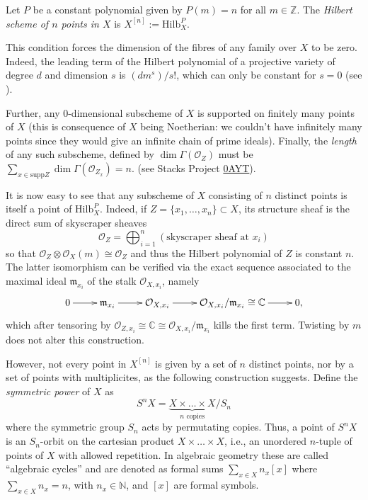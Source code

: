 \begin{definition}
\label{definition-hilbert-scheme-of-points}
Let $P$ be a constant polynomial given by
$P(m)=n$ for all $m \in \mathbb{Z}$.
The {\it Hilbert scheme of $n$ points in
$X$} is $X^{[n]}:=\text{Hilb}^P_X$.
\end{definition}

\noindent
This condition forces the dimension of the
fibres of any family
over $X$ to be zero. Indeed, the leading term
of the Hilbert polynomial of a projective
variety of degree $d$
and dimension $s$ is $(dm^s)/s!$, which can
only be constant
for $s=0$ (see \cite[Exercise
1.13]{HarrMorr}).

Further, any 0-dimensional subscheme of $X$
is supported on finitely many points of $X$
(this is consequence of $X$ being Noetherian:
we couldn't have infinitely many points
since they
would give an infinite chain of prime
ideals).
Finally, the {\it length} of any such
subscheme, defined by
 $\dim\Gamma(\mathcal{O}_Z)$
must be $\sum_{x \in \text{supp}
Z}\dim\Gamma(\mathcal{O}_{Z_x})=n$.
(see Stacks Project
\href{https://stacks.math.columbia.edu/tag/0AYT}{0AYT}).

\medskip\noindent
It is now easy to see that any subscheme of
$X$ consisting of $n$ distinct
points is itself a point of
$\text{Hilb}_X^P$.
Indeed, if $Z=\{x_1,\ldots,x_n\}\subset X$,
its
structure sheaf is the direct sum of
skyscraper sheaves
$$
\mathcal{O}_Z=\bigoplus_{i=1}^n
(\text{skyscraper sheaf at $x_i$})
$$
so that $\mathcal{O}_Z \otimes
\mathcal{O}_X(m)\cong\mathcal{O}_Z$
and thus the Hilbert polynomial of $Z$ is
constant $n$.
The latter isomorphism can be verified via
the exact sequence associated to the maximal
ideal
$\mathfrak{m}_{x_i}$
of the stalk $\mathcal{O}_{X,x_i}$, namely
$$
\xymatrix{
0\ar[r]
&\mathfrak{m}_{x_i}\ar[r]
&\mathcal{O}_{X,x_i}\ar[r]
&\mathcal{O}_{X,x_i}/\mathfrak{m}_{x_i}\cong\mathbb{C}\ar[r]
&0,
}
$$
which after tensoring by
$\mathcal{O}_{Z,x_i}
\cong\mathbb{C}\cong\mathcal{O}_{X,x_i}/\mathfrak{m}_{x_i}$
kills the first term.
Twisting by $m$ does not alter this
construction.

\medskip\noindent
However, not every point in $X^{[n]}$ is
given
by a set of $n$ distinct points,
nor by a set of points with multiplicites,
as the following construction suggests.
Define the {\it symmetric power} of $X$ as
$$
S^nX=\underbrace{X \times \ldots \times
X}_{n\text{ copies}}/S_n
$$
where the symmetric group $S_n$ acts by
permutating copies. Thus, a point of $S^nX$
is
an $S_n$-orbit on the cartesian product $X
\times \ldots \times X$,
i.e., an unordered $n$-tuple of points of $X$
with allowed repetition.
In algebraic geometry these are called
``algebraic cycles''
and are denoted as formal sums $\sum_{x \in
X}n_x[x]$
where $\sum_{x \in X}n_x=n$, with $n_x \in
\mathbb{N}$,
and $[x]$ are formal symbols.

